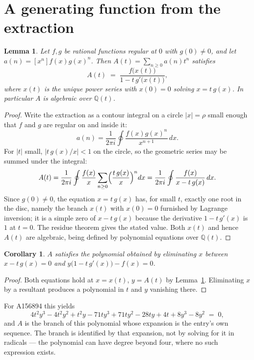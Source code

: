 \documentclass[11pt,a4paper]{article}
\theoremstyle{plain}
\newtheorem{lemma}[theorem]{Lemma}
\newtheorem{corollary}[theorem]{Corollary}
\theoremstyle{definition}
\begin{document}
\section{A generating function from the extraction}

\begin{lemma}\label{lem:diag}
Let $f,g$ be rational functions regular at $0$ with $g(0)\neq0$, and let
$a(n)=[x^{n}]f(x)g(x)^{n}$. Then $A(t)=\sum_{n\ge0}a(n)t^{n}$ satisfies
\[
A(t)\;=\;\frac{f\bigl(x(t)\bigr)}{1-t\,g'\bigl(x(t)\bigr)},
\]
where $x(t)$ is the unique power series with $x(0)=0$ solving $x=t\,g(x)$. In particular
$A$ is algebraic over $\mathbb{Q}(t)$.
\end{lemma}

\begin{proof}
Write the extraction as a contour integral on a circle $|x|=\rho$ small enough that $f$
and $g$ are regular on and inside it:
\[
a(n)=\frac{1}{2\pi i}\oint \frac{f(x)g(x)^{n}}{x^{n+1}}\,dx .
\]
For $|t|$ small, $|t\,g(x)/x|<1$ on the circle, so the geometric series may be summed
under the integral:
\[
A(t)=\frac{1}{2\pi i}\oint\frac{f(x)}{x}\sum_{n\ge0}\Bigl(\frac{t\,g(x)}{x}\Bigr)^{n}dx
     =\frac{1}{2\pi i}\oint\frac{f(x)}{x-t\,g(x)}\,dx .
\]
Since $g(0)\neq0$, the equation $x=t\,g(x)$ has, for small $t$, exactly one root in the
disc, namely the branch $x(t)$ with $x(0)=0$ furnished by Lagrange inversion; it is a
simple zero of $x-t\,g(x)$ because the derivative $1-t\,g'(x)$ is $1$ at $t=0$. The
residue theorem gives the stated value. Both $x(t)$ and hence $A(t)$ are algebraic,
being defined by polynomial equations over $\mathbb{Q}(t)$.
\end{proof}

\begin{corollary}\label{cor:minpoly}
$A$ satisfies the polynomial obtained by eliminating $x$ between
$x-t\,g(x)=0$ and $y\bigl(1-t\,g'(x)\bigr)-f(x)=0$.
\end{corollary}

\begin{proof}
Both equations hold at $x=x(t)$, $y=A(t)$ by Lemma~\ref{lem:diag}. Eliminating $x$ by a
resultant produces a polynomial in $t$ and $y$ vanishing there.
\end{proof}

For A156894 this yields
\[
4 t^{2} y^{3} - 4 t^{2} y^{2} + t^{2} y - 71 t y^{3} + 71 t y^{2} - 28 t y + 4 t + 8 y^{3} - 8 y^{2} \;=\;0 ,
\]
and $A$ is the branch of this polynomial whose expansion is the entry's own sequence.
The branch is identified by that expansion, not by solving for it in radicals --- the
polynomial can have degree beyond four, where no such expression exists.
\end{document}
